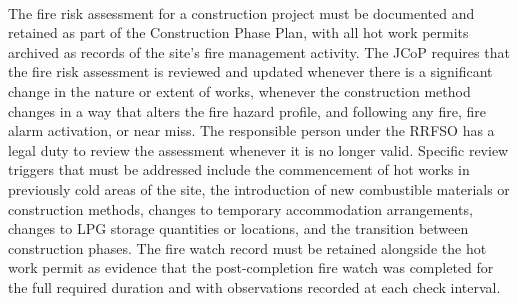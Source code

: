 \paragraph{}
The fire risk assessment for a construction project must be documented and retained as part of the Construction Phase Plan, with all hot work permits archived as records of the site's fire management activity. The JCoP requires that the fire risk assessment is reviewed and updated whenever there is a significant change in the nature or extent of works, whenever the construction method changes in a way that alters the fire hazard profile, and following any fire, fire alarm activation, or near miss. The responsible person under the RRFSO has a legal duty to review the assessment whenever it is no longer valid. Specific review triggers that must be addressed include the commencement of hot works in previously cold areas of the site, the introduction of new combustible materials or construction methods, changes to temporary accommodation arrangements, changes to LPG storage quantities or locations, and the transition between construction phases. The fire watch record must be retained alongside the hot work permit as evidence that the post-completion fire watch was completed for the full required duration and with observations recorded at each check interval.

